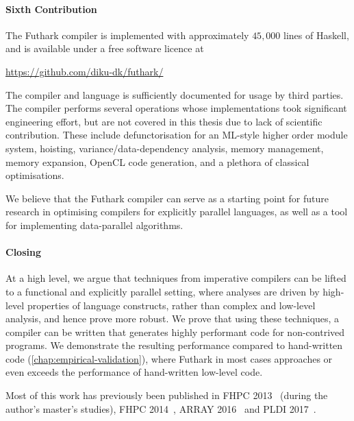 \paragraph{Sixth Contribution}

The Futhark compiler is implemented with approximately $45,000$ lines
of Haskell, and is available under a free software licence at

\centerline{\url{https://github.com/diku-dk/futhark/}}

The compiler and language is sufficiently documented for usage by
third parties.  The compiler performs several operations whose
implementations took significant engineering effort, but are not
covered in this thesis due to lack of scientific contribution.  These
include defunctorisation for an ML-style higher order module system,
hoisting, variance/data-dependency analysis, memory management, memory
expansion, OpenCL code generation, and a plethora of classical
optimisations.

We believe that the Futhark compiler can serve as a starting point for
future research in optimising compilers for explicitly parallel
languages, as well as a tool for implementing data-parallel
algorithms.

\paragraph{Closing}

At a high level, we argue that techniques from imperative compilers
can be lifted to a functional and explicitly parallel setting, where
analyses are driven by high-level properties of language constructs,
rather than complex and low-level analysis, and hence prove more
robust.  We prove that using these techniques, a compiler can be
written that generates highly performant code for non-contrived
programs.  We demonstrate the resulting performance compared to
hand-written code (\cref{chap:empirical-validation}), where Futhark in
most cases approaches or even exceeds the performance of hand-written
low-level code.

Most of this work has previously been published in FHPC
2013~\cite{henriksen2013t2} (during the author's master's studies),
FHPC 2014~\cite{henriksen2014size}, ARRAY 2016~\cite{Futhark:redomap,}
and PLDI 2017~\cite{henriksen2017futhark}.

